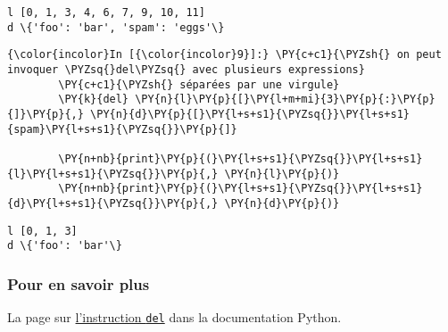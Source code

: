     \begin{Verbatim}[commandchars=\\\{\},frame=single,framerule=0.3mm,rulecolor=\color{cellframecolor}]
l [0, 1, 3, 4, 6, 7, 9, 10, 11]
d \{'foo': 'bar', 'spam': 'eggs'\}
\end{Verbatim}

    \begin{Verbatim}[commandchars=\\\{\},frame=single,framerule=0.3mm,rulecolor=\color{cellframecolor}]
{\color{incolor}In [{\color{incolor}9}]:} \PY{c+c1}{\PYZsh{} on peut invoquer \PYZsq{}del\PYZsq{} avec plusieurs expressions}
        \PY{c+c1}{\PYZsh{} séparées par une virgule}
        \PY{k}{del} \PY{n}{l}\PY{p}{[}\PY{l+m+mi}{3}\PY{p}{:}\PY{p}{]}\PY{p}{,} \PY{n}{d}\PY{p}{[}\PY{l+s+s1}{\PYZsq{}}\PY{l+s+s1}{spam}\PY{l+s+s1}{\PYZsq{}}\PY{p}{]}
        
        \PY{n+nb}{print}\PY{p}{(}\PY{l+s+s1}{\PYZsq{}}\PY{l+s+s1}{l}\PY{l+s+s1}{\PYZsq{}}\PY{p}{,} \PY{n}{l}\PY{p}{)}
        \PY{n+nb}{print}\PY{p}{(}\PY{l+s+s1}{\PYZsq{}}\PY{l+s+s1}{d}\PY{l+s+s1}{\PYZsq{}}\PY{p}{,} \PY{n}{d}\PY{p}{)}
\end{Verbatim}


    \begin{Verbatim}[commandchars=\\\{\},frame=single,framerule=0.3mm,rulecolor=\color{cellframecolor}]
l [0, 1, 3]
d \{'foo': 'bar'\}
\end{Verbatim}

    \hypertarget{pour-en-savoir-plus}{%
\subsubsection{Pour en savoir plus}\label{pour-en-savoir-plus}}

    La page sur
\href{https://docs.python.org/3/reference/simple_stmts.html\#the-del-statement}{l'instruction
\texttt{del}} dans la documentation Python.


    
    
    
